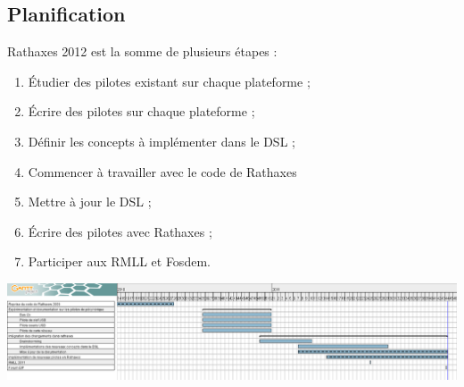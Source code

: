 \subsection{Planification}

Rathaxes 2012 est la somme de plusieurs étapes :

\begin{enumerate}
\item Étudier des pilotes existant sur chaque plateforme ;
\item Écrire des pilotes sur chaque plateforme ;
\item Définir les concepts à implémenter dans le DSL ;
\item Commencer \`a travailler avec le code de Rathaxes
\item Mettre \`a jour le DSL ;
\item Écrire des pilotes avec Rathaxes ;
\item Participer aux RMLL et Fosdem.
\end{enumerate}

\begin{center}

\includegraphics[angle=90,scale=0.35]{../images/gantt}

\end{center}
